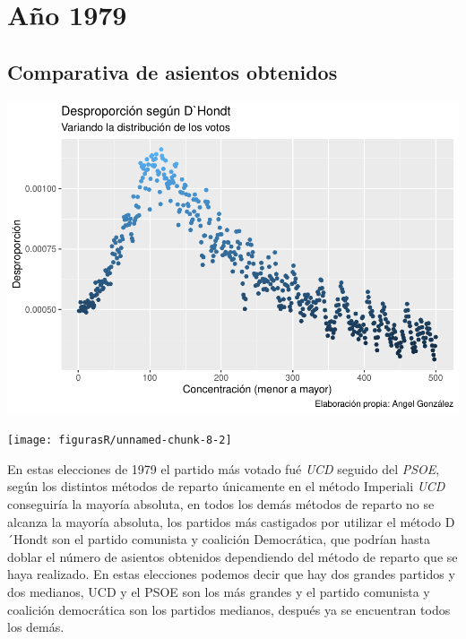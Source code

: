 \documentclass[12pt,a4paper,]{book}
\numberwithin{dummy}{section}
\theoremstyle{ocrenumbox}
\theoremstyle{blacknumex}
\theoremstyle{blacknumbox}
\theoremstyle{ocrenum}
\theoremstyle{ocrenum}
\begin{document}
\hypertarget{auxf1o-1979}{%
\section{Año 1979}\label{auxf1o-1979}}

\hypertarget{comparativa-de-asientos-obtenidos-1}{%
\subsection{Comparativa de asientos
obtenidos}\label{comparativa-de-asientos-obtenidos-1}}

\begin{center}\includegraphics[width=1\linewidth]{figurasR/unnamed-chunk-8-1} \end{center}

\begin{center}\texttt{[image: figurasR/unnamed-chunk-8-2]} \end{center}

En estas elecciones de 1979 el partido más votado fué \emph{UCD} seguido
del \emph{PSOE}, según los distintos métodos de reparto únicamente en el
método Imperiali \emph{UCD} conseguiría la mayoría absoluta, en todos
los demás métodos de reparto no se alcanza la mayoría absoluta, los
partidos más castigados por utilizar el método D´Hondt son el partido
comunista y coalición Democrática, que podrían hasta doblar el número de
asientos obtenidos dependiendo del método de reparto que se haya
realizado. En estas elecciones podemos decir que hay dos grandes
partidos y dos medianos, UCD y el PSOE son los más grandes y el partido
comunista y coalición democrática son los partidos medianos, después ya
se encuentran todos los demás.
\end{document}
